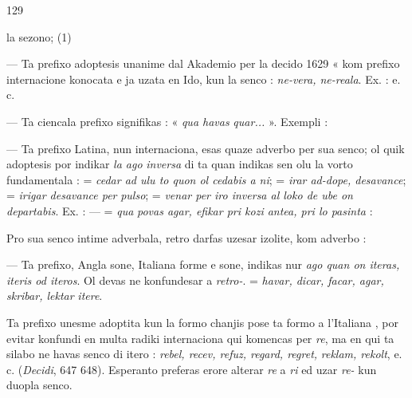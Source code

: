 \begin{VUpage}[133]{129}

\VUcontinue
la sezono; \cc
{} (1)

 --- Ta prefixo adoptesis unanime dal Akademio\nl
per la decido 1629 « kom prefixo internacione konocata\nl
e ja uzata en Ido, kun la senco : \textit{ne-vera, ne-reala}. Ex. :\nl
{}\cc
{}\cc
{} e. c.

 --- Ta ciencala prefixo signifikas : « \textit{qua havas}\nl
\textit{quar...} ». Exempli : \nl
{}

 --- Ta prefixo Latina, nun internaciona, esas quaze\nl
adverbo per sua senco; ol quik adoptesis por indikar \textit{la ago}\nl
\textit{inversa} di ta quan indikas sen olu la vorto fundamentala :\nl
{} = \textit{cedar ad ulu to quon ol cedabis a ni}; \nl
= \textit{irar ad-dope, desavance};  = \textit{irigar desavance per}\nl
\textit{pulso};  = \textit{venar per iro inversa al loko de ube on}\nl
\textit{departabis}. Ex. : \cc
{} ---  = \textit{qua}\nl
\textit{povas agar, efikar pri kozi antea, pri lo pasinta} : \nl
{}

Pro sua senco intime adverbala, retro darfas uzesar izolite,\nl
kom adverbo : 

 --- Ta prefixo, Angla sone, Italiana forme e sone,\nl
indikas nur \textit{ago quan on iteras, iteris od iteros}. Ol devas\nl
ne konfundesar a \textit{retro-}. \nl
{} = \textit{havar, dicar, facar, agar, skribar, lektar}\nl
\textit{itere}. \cc
{}

Ta prefixo unesme adoptita kun la formo  chanjis pose\nl
ta formo a l'Italiana , por evitar konfundi en multa radiki\nl
internaciona qui komencas per \textit{re}, ma en qui ta silabo ne\nl
havas senco di itero : \textit{rebel, recev, refuz, regard, regret,}\nl
\textit{reklam, rekolt}, e. c. (\textit{Decidi}, 647  648). Esperanto preferas\nl
erore alterar \textit{re} a \textit{ri} ed uzar \textit{re-} kun duopla senco.
\end{VUpage}

